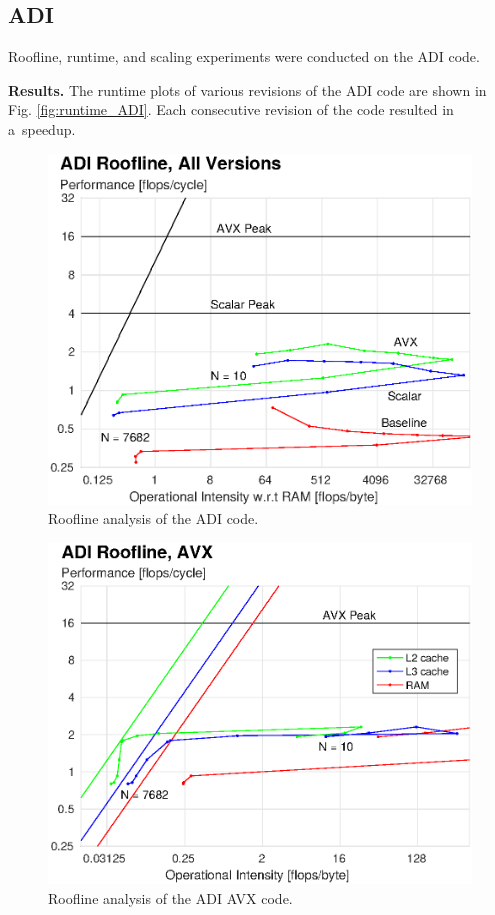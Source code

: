 \documentclass[letterpaper]{article}
\newcommand{\mypar}[1]{{\bf #1.}}
\begin{document}
\subsection{ADI}\label{subsec:ADI_results}
Roofline, runtime, and scaling experiments were conducted on the ADI code.

\mypar{Results}
The runtime plots of various revisions of the ADI code are shown in Fig. \ref{fig:runtime_ADI}. Each consecutive revision of the code resulted in a~speedup.

\begin{figure}\centering
  \includegraphics[width=\linewidth]{./plots/roofline_ADI_all.eps}
  \caption{Roofline analysis of the ADI code.}
  \label{fig:roofline_ADI_all}
\end{figure}

\begin{figure}\centering
  \includegraphics[width=\linewidth]{./plots/roofline_ADI_AVX.eps}
  \caption{Roofline analysis of the ADI AVX code.}
  \label{fig:roofline_ADI_AVX}
\end{figure}
\end{document}
